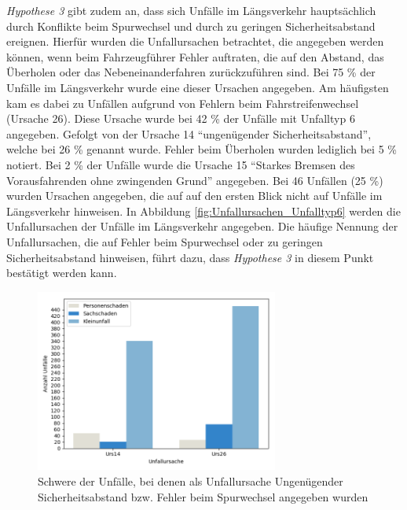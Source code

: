 \textit{Hypothese 3} gibt zudem an, dass sich Unfälle im Längsverkehr hauptsächlich durch Konflikte beim Spurwechsel und durch zu geringen Sicherheitsabstand ereignen. Hierfür wurden die Unfallursachen betrachtet, die angegeben werden können, wenn beim Fahrzeugführer Fehler auftraten, die auf den Abstand, das Überholen oder das Nebeneinanderfahren zurückzuführen sind. Bei 75 \% der Unfälle im Längsverkehr wurde eine dieser Ursachen angegeben. Am häufigsten kam es dabei zu Unfällen aufgrund von Fehlern beim Fahrstreifenwechsel (Ursache 26). Diese Ursache wurde bei 42 \% der Unfälle mit Unfalltyp 6 angegeben. Gefolgt von der Ursache 14 \enquote{ungenügender Sicherheitsabstand}, welche bei 26 \% genannt wurde. Fehler beim Überholen wurden lediglich bei 5 \% notiert. Bei 2 \% der Unfälle wurde die Ursache 15 \enquote{Starkes Bremsen des Vorausfahrenden ohne zwingenden Grund} angegeben. Bei 46 Unfällen (25 \%) wurden Ursachen angegeben, die auf auf den ersten Blick nicht auf Unfälle im Längsverkehr hinweisen. In Abbildung \ref{fig:Unfallursachen_Unfalltyp6} werden die Unfallursachen der Unfälle im Längsverkehr angegeben. Die häufige Nennung der Unfallursachen, die auf Fehler beim Spurwechsel oder zu geringen Sicherheitsabstand hinweisen, führt dazu, dass \textit{Hypothese 3} in diesem Punkt bestätigt werden kann.

\begin{savenotes}
	\begin{figure}[H]
		\centering
		\includegraphics[width=8cm,height=6cm]{figures/Urs14_Urs26_Md}
		\caption[Schwere der Unfälle, bei denen als Unfallursache Ungenügender Sicherheitsabstand bzw. Fehler beim Spurwechsel angegeben wurden]{Schwere der Unfälle, bei denen als Unfallursache Ungenügender Sicherheitsabstand bzw. Fehler beim Spurwechsel angegeben wurden}\label{fig:Unfallursachen_14_26}
	\end{figure}
\end{savenotes}

